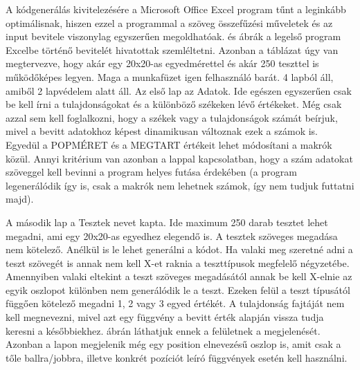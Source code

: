 \documentclass[12pt,a4paper,oneside]{report}
\begin{document}
    
    A kódgenerálás kivitelezésére a Microsoft Office Excel program tűnt a leginkább optimálisnak, hiszen ezzel a programmal a szöveg összefűzési műveletek és az input bevitele viszonylag egyszerűen megoldhatóak.
     és  ábrák a legelső program Excelbe történő bevitelét hivatottak szemléltetni.
    Azonban a táblázat úgy van megtervezve, hogy akár egy 20x20-as egyedmérettel és akár 250 teszttel is működőképes legyen.
    Maga a munkafüzet igen felhasználó barát. 4 lapból áll, amiből 2 lapvédelem alatt áll.
    Az első lap az Adatok.
    Ide egészen egyszerűen csak be kell írni a tulajdonságokat és a különböző székeken lévő értékeket.
    Még csak azzal sem kell foglalkozni, hogy a székek vagy a tulajdonságok számát beírjuk, mivel a bevitt adatokhoz képest dinamikusan változnak ezek a számok is.
    Egyedül a POPMÉRET és a MEGTART értékeit lehet módosítani a makrók közül.
    Annyi kritérium van azonban a lappal kapcsolatban, hogy a szám adatokat szöveggel kell bevinni a program helyes futása érdekében (a program legenerálódik így is, csak a makrók nem lehetnek számok, így nem tudjuk futtatni majd).

    
      
    A második lap a Tesztek nevet kapta. Ide maximum 250 darab tesztet lehet megadni, ami egy 20x20-as egyedhez elegendő is.
    A tesztek szöveges megadása nem kötelező.
    Anélkül is le lehet generálni a kódot.
    Ha valaki meg szeretné adni a teszt szövegét is annak nem kell X-et raknia a teszttípusok megfelelő négyzetébe.
    Amennyiben valaki eltekint a teszt szöveges megadásától annak be kell X-elnie az egyik oszlopot különben nem generálódik le a teszt.
    Ezeken felül a teszt típusától függően kötelező megadni 1, 2 vagy 3 egyed értékét.
    A tulajdonság fajtáját nem kell megnevezni, mivel azt egy függvény a bevitt érték alapján vissza tudja keresni a későbbiekhez.
     ábrán láthatjuk ennek a felületnek a megjelenését.
    Azonban a lapon megjelenik még egy position elnevezésű oszlop is, amit csak a tőle ballra/jobbra, illetve konkrét pozíciót leíró függvények esetén kell használni.
    
\end{document}
